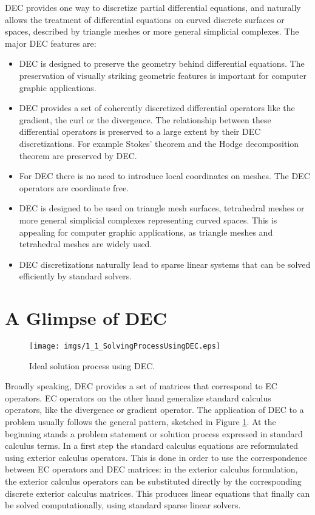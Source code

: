 DEC provides one way to discretize partial differential equations, and naturally allows the treatment of differential equations on curved discrete surfaces or spaces, described by triangle meshes or more general simplicial complexes. The major DEC features are:
\begin{itemize}
	\item DEC is designed to preserve the geometry behind differential equations. The preservation of visually striking geometric features is important for computer graphic applications.
	\item DEC provides a set of coherently discretized differential operators like the gradient, the curl or the divergence. The relationship between these differential operators is preserved to a large extent by their DEC discretizations. For example Stokes' theorem and the Hodge decomposition theorem are preserved by DEC.
	\item For DEC there is no need to introduce local coordinates on meshes. The DEC operators are coordinate free.
	\item DEC is designed to be used on triangle mesh surfaces, tetrahedral meshes or more general simplicial complexes representing curved spaces. This is appealing for computer graphic applications, as triangle meshes and tetrahedral meshes are widely used.
	\item DEC discretizations naturally lead to sparse linear systems that can be solved efficiently by standard solvers.
\end{itemize}


\section{A Glimpse of DEC}
\label{sec:1_example}
\begin{figure}
\begin{center}
\texttt{[image: imgs/1\_1\_SolvingProcessUsingDEC.eps]}
\end{center}
\caption{Ideal solution process using DEC.}
\label{fig:1_solutionprocess}
\end{figure}
	
Broadly speaking, DEC provides a set of matrices that correspond to EC operators. EC operators on the other hand generalize standard calculus operators, like the divergence or gradient operator. 
The application of DEC to a problem usually follows the general pattern, sketched in Figure \ref{fig:1_solutionprocess}. At the beginning stands a problem statement or solution process expressed in standard calculus terms. In a first step the standard calculus equations are reformulated using exterior calculus operators. This is done in order to use the correspondence between EC operators and DEC matrices: in the exterior calculus formulation, the exterior calculus operators can be substituted directly by the corresponding discrete exterior calculus matrices. This produces linear equations that finally can be solved computationally, using standard sparse linear solvers. 

